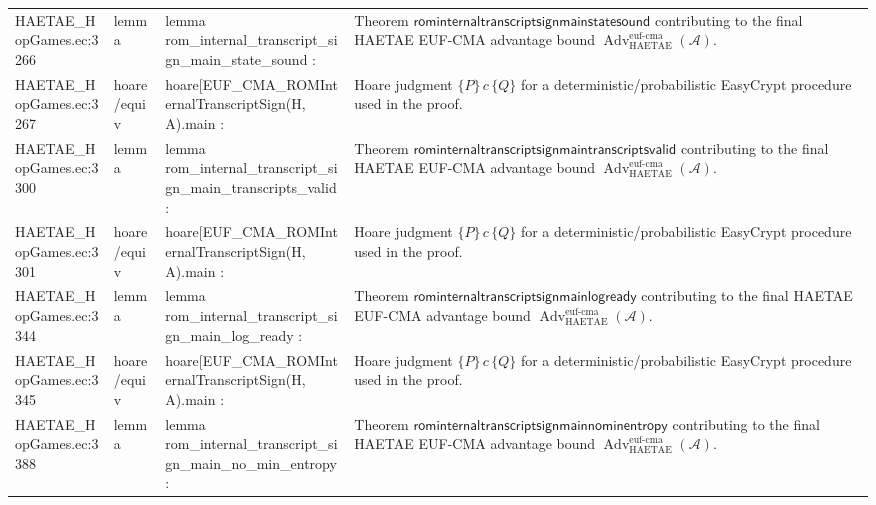\documentclass[10pt]{article}
\newcommand{\Adv}{\operatorname{Adv}}
\begin{document}
\begin{longtable}{L{0.11\textwidth}L{0.055\textwidth}L{0.385\textwidth}L{0.41\textwidth}}
HAETAE\_\allowbreak{}HopGames.\allowbreak{}ec:\allowbreak{}3266 & lemma & {\ttfamily\scriptsize lemma rom\_\allowbreak{}internal\_\allowbreak{}transcript\_\allowbreak{}sign\_\allowbreak{}main\_\allowbreak{}state\_\allowbreak{}sound :} & Theorem $\mathsf{rominternaltranscriptsignmainstatesound}$ contributing to the final HAETAE EUF-CMA advantage bound $\Adv_{\mathrm{HAETAE}}^{\mathrm{euf\mbox{-}cma}}(\mathcal A)$. \\
HAETAE\_\allowbreak{}HopGames.\allowbreak{}ec:\allowbreak{}3267 & hoare/equiv & {\ttfamily\scriptsize hoare[EUF\_\allowbreak{}CMA\_\allowbreak{}ROMInternalTranscriptSign(H, A).main :} & Hoare judgment $\{P\}\,c\,\{Q\}$ for a deterministic/probabilistic EasyCrypt procedure used in the proof. \\
HAETAE\_\allowbreak{}HopGames.\allowbreak{}ec:\allowbreak{}3300 & lemma & {\ttfamily\scriptsize lemma rom\_\allowbreak{}internal\_\allowbreak{}transcript\_\allowbreak{}sign\_\allowbreak{}main\_\allowbreak{}transcripts\_\allowbreak{}valid :} & Theorem $\mathsf{rominternaltranscriptsignmaintranscriptsvalid}$ contributing to the final HAETAE EUF-CMA advantage bound $\Adv_{\mathrm{HAETAE}}^{\mathrm{euf\mbox{-}cma}}(\mathcal A)$. \\
HAETAE\_\allowbreak{}HopGames.\allowbreak{}ec:\allowbreak{}3301 & hoare/equiv & {\ttfamily\scriptsize hoare[EUF\_\allowbreak{}CMA\_\allowbreak{}ROMInternalTranscriptSign(H, A).main :} & Hoare judgment $\{P\}\,c\,\{Q\}$ for a deterministic/probabilistic EasyCrypt procedure used in the proof. \\
HAETAE\_\allowbreak{}HopGames.\allowbreak{}ec:\allowbreak{}3344 & lemma & {\ttfamily\scriptsize lemma rom\_\allowbreak{}internal\_\allowbreak{}transcript\_\allowbreak{}sign\_\allowbreak{}main\_\allowbreak{}log\_\allowbreak{}ready :} & Theorem $\mathsf{rominternaltranscriptsignmainlogready}$ contributing to the final HAETAE EUF-CMA advantage bound $\Adv_{\mathrm{HAETAE}}^{\mathrm{euf\mbox{-}cma}}(\mathcal A)$. \\
HAETAE\_\allowbreak{}HopGames.\allowbreak{}ec:\allowbreak{}3345 & hoare/equiv & {\ttfamily\scriptsize hoare[EUF\_\allowbreak{}CMA\_\allowbreak{}ROMInternalTranscriptSign(H, A).main :} & Hoare judgment $\{P\}\,c\,\{Q\}$ for a deterministic/probabilistic EasyCrypt procedure used in the proof. \\
HAETAE\_\allowbreak{}HopGames.\allowbreak{}ec:\allowbreak{}3388 & lemma & {\ttfamily\scriptsize lemma rom\_\allowbreak{}internal\_\allowbreak{}transcript\_\allowbreak{}sign\_\allowbreak{}main\_\allowbreak{}no\_\allowbreak{}min\_\allowbreak{}entropy :} & Theorem $\mathsf{rominternaltranscriptsignmainnominentropy}$ contributing to the final HAETAE EUF-CMA advantage bound $\Adv_{\mathrm{HAETAE}}^{\mathrm{euf\mbox{-}cma}}(\mathcal A)$. \\

\end{longtable}
\end{document}
